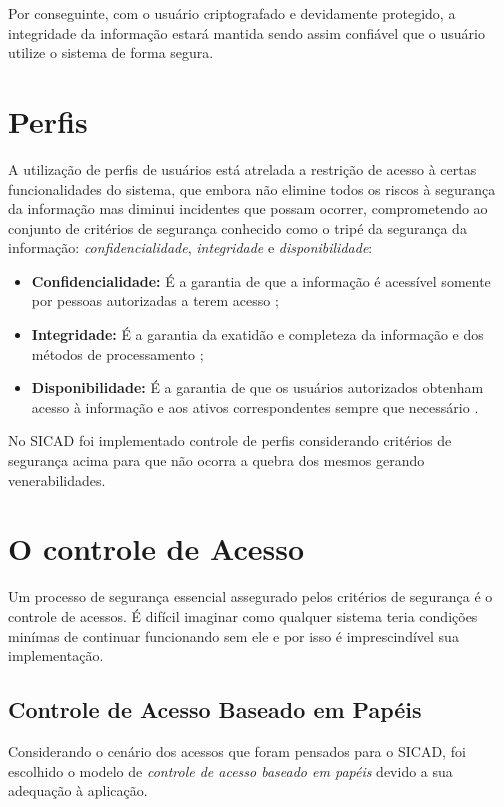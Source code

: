 \documentclass[12pt, a4paper]{report}
\begin{document}
Por conseguinte, com o usuário criptografado e devidamente protegido, a integridade da informação estará mantida sendo assim confiável que o usuário utilize o sistema de forma segura.

\section{Perfis}
A utilização de perfis de usuários está atrelada a restrição de acesso à certas funcionalidades do sistema, que embora não elimine todos os riscos à segurança da informação mas diminui incidentes que possam ocorrer, comprometendo ao conjunto de critérios de segurança conhecido como o tripé da segurança da informação: \textit{confidencialidade}, \textit{integridade} e \textit{disponibilidade}:

\begin{itemize}
\item \textbf{Confidencialidade:} É a garantia de que a informação é acessível somente por pessoas autorizadas a terem acesso \cite{iso27001};
\item \textbf{Integridade:} É a garantia da exatidão e completeza da informação e dos métodos de processamento \cite{iso27001};
\item \textbf{Disponibilidade:} É a garantia de que os usuários autorizados obtenham acesso à informação e aos ativos correspondentes sempre  que necessário \cite{iso27001}.
\end{itemize}

No \ac{SICAD} foi implementado controle de perfis considerando critérios de segurança acima para que não ocorra a quebra dos mesmos gerando venerabilidades.

\section{O controle de Acesso}
Um processo de segurança essencial assegurado pelos critérios de segurança é o controle de acessos. É difícil imaginar como qualquer sistema teria condições minímas de continuar funcionando sem ele e por isso é imprescindível sua implementação.

\subsection{Controle  de  Acesso  Baseado  em  Papéis}
Considerando o cenário dos acessos que foram pensados para o \ac{SICAD}, foi escolhido o modelo de \textit{controle  de  acesso  baseado  em  papéis} devido a sua adequação à aplicação.
\end{document}
